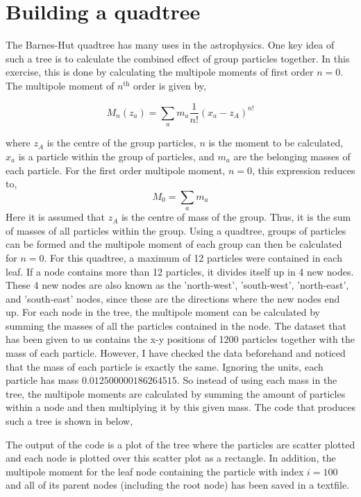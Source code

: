 \section{Building a quadtree}

The Barnes-Hut quadtree has many uses in the astrophysics. One key idea of such a tree is to calculate the combined effect of group particles together. In this exercise, this is done by calculating the multipole moments of first order $n=0$. The multipole moment of $n^{\mathrm{th}}$ order is given by,

\begin{equation*}
M_n (z_a) = \sum_{a} m_a \frac{1}{n!}(x_a - z_A)^{n!}
\end{equation*}

where $z_A$ is the centre of the group particles, $n$ is the moment to be calculated,
$x_a$ is a particle within the group of particles, and $m_a$ are the belonging masses of each particle. For the first order multipole moment, $n=0$, this expression reduces to,
\begin{equation*}
M_0 = \sum_a m_a
\end{equation*}
Here it is assumed that $z_A$ is the centre of mass of the group. Thus,
 it is the sum of masses of all particles within the group. Using a quadtree, groups of particles can be formed and the multipole moment of each group can then be calculated for $n=0$. For this quadtree, a maximum of 12 particles were contained in each leaf. If a node contains more than 12 particles, it divides itself up in 4 new nodes. These 4 new nodes are also known as the 'north-west', 'south-west', 'north-east', and 'south-east' nodes, since these are the directions where the new nodes end up. For each node in the tree, the multipole moment can be calculated by summing the masses of all the particles contained in the node. The dataset that has been given to us contains the x-y positions of 1200 particles together with the mass of each particle. However, I have checked the data beforehand and noticed that the mass of each particle is exactly the same. Ignoring the units, each particle has mass $0.012500000186264515$. So instead of using each mass in the tree, the multipole moments are calculated by summing the amount of particles within a node and then multiplying it by this given mass. The code that produces such a tree is shown in below,
 
 
 The output of the code is a plot of the tree where the particles are scatter plotted and each node is plotted over this scatter plot as a rectangle. In addition, the multipole moment for the leaf node containing the particle with index $i = 100$ and all of its parent nodes (including the root node) has been saved in a textfile.
 

